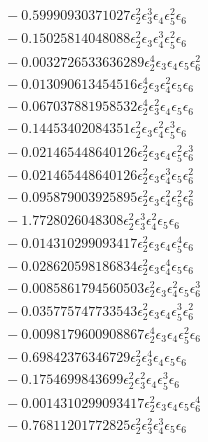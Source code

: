 \documentclass[10pt]{article}
\begin{document}
\begin{align*}
&{}  - 0.59990930371027 \epsilon_{2}^{2} \epsilon_{3}^{3} \epsilon_{4} \epsilon_{5}^{2} \epsilon_{6} \\
&{}  - 0.15025814048088 \epsilon_{2}^{2} \epsilon_{3} \epsilon_{4}^{3} \epsilon_{5}^{2} \epsilon_{6} \\
&{}  - 0.0032726533636289 \epsilon_{2}^{4} \epsilon_{3} \epsilon_{4} \epsilon_{5} \epsilon_{6}^{2} \\
&{}  - 0.013090613454516 \epsilon_{2}^{4} \epsilon_{3} \epsilon_{4}^{2} \epsilon_{5} \epsilon_{6} \\
&{}  - 0.067037881958532 \epsilon_{2}^{4} \epsilon_{3}^{2} \epsilon_{4} \epsilon_{5} \epsilon_{6} \\
&{}  - 0.14453402084351 \epsilon_{2}^{2} \epsilon_{3} \epsilon_{4}^{2} \epsilon_{5}^{3} \epsilon_{6} \\
&{}  - 0.021465448640126 \epsilon_{2}^{2} \epsilon_{3} \epsilon_{4} \epsilon_{5}^{2} \epsilon_{6}^{3} \\
&{}  - 0.021465448640126 \epsilon_{2}^{2} \epsilon_{3} \epsilon_{4}^{3} \epsilon_{5} \epsilon_{6}^{2} \\
&{}  - 0.095879003925895 \epsilon_{2}^{2} \epsilon_{3} \epsilon_{4}^{2} \epsilon_{5}^{2} \epsilon_{6}^{2} \\
&{}  - 1.7728026048308 \epsilon_{2}^{2} \epsilon_{3}^{3} \epsilon_{4}^{2} \epsilon_{5} \epsilon_{6} \\
&{}  - 0.014310299093417 \epsilon_{2}^{2} \epsilon_{3} \epsilon_{4} \epsilon_{5}^{4} \epsilon_{6} \\
&{}  - 0.028620598186834 \epsilon_{2}^{2} \epsilon_{3} \epsilon_{4}^{4} \epsilon_{5} \epsilon_{6} \\
&{}  - 0.0085861794560503 \epsilon_{2}^{2} \epsilon_{3} \epsilon_{4}^{2} \epsilon_{5} \epsilon_{6}^{3} \\
&{}  - 0.035775747733543 \epsilon_{2}^{2} \epsilon_{3} \epsilon_{4} \epsilon_{5}^{3} \epsilon_{6}^{2} \\
&{}  - 0.0098179600908867 \epsilon_{2}^{4} \epsilon_{3} \epsilon_{4} \epsilon_{5}^{2} \epsilon_{6} \\
&{}  - 0.69842376346729 \epsilon_{2}^{2} \epsilon_{3}^{4} \epsilon_{4} \epsilon_{5} \epsilon_{6} \\
&{}  - 0.1754699843699 \epsilon_{2}^{2} \epsilon_{3}^{2} \epsilon_{4} \epsilon_{5}^{3} \epsilon_{6} \\
&{}  - 0.0014310299093417 \epsilon_{2}^{2} \epsilon_{3} \epsilon_{4} \epsilon_{5} \epsilon_{6}^{4} \\
&{}  - 0.76811201772825 \epsilon_{2}^{2} \epsilon_{3}^{2} \epsilon_{4}^{3} \epsilon_{5} \epsilon_{6} \\

\end{align*}
\end{document}
